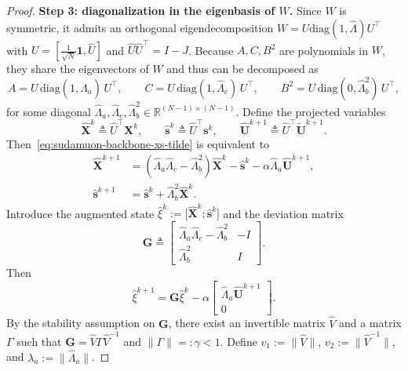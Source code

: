 \documentclass{article}
\newcommand{\G}{\mathbf{G}}
\begin{document}
\begin{proof}
\medskip\noindent\textbf{Step 3: diagonalization in the eigenbasis of $W$.}
Since $W$ is symmetric, it admits an orthogonal eigendecomposition
$W=U\mathrm{diag}(1,\hat\Lambda)U^\top$ with $U=[\tfrac{1}{\sqrt N}\mathbf 1,\hat U]$ and $\hat U\hat U^\top=I-J$.
Because $A,C,B^2$ are polynomials in $W$, they share the eigenvectors of $W$ and thus can be decomposed as
\[
A = U\,\mathrm{diag}(1,\hat\Lambda_a)\,U^\top,\qquad
C = U\,\mathrm{diag}(1,\hat\Lambda_c)\,U^\top,\qquad
B^2 = U\,\mathrm{diag}(0,\hat\Lambda_b^2)\,U^\top,
\]
for some diagonal $\hat\Lambda_a,\hat\Lambda_c,\hat\Lambda_b^2\in\mathbb{R}^{(N-1)\times(N-1)}$.
Define the projected variables
\[
\hat{\mathbf X}^k \triangleq \hat U^\top\mathbf X^k,\qquad
\hat{\mathbf s}^k \triangleq \hat U^\top\mathbf s^k,
\qquad
\hat{\mathbf U}^{k+1}\triangleq \hat U^\top\tilde{\mathbf U}^{k+1}.
\]
Then~\eqref{eq:sudamuon-backbone-xs-tilde} is equivalent to
\begin{subequations}
\label{eq:sudamuon-backbone-projected}
\begin{align}
\hat{\mathbf X}^{k+1}
&= (\hat\Lambda_a\hat\Lambda_c-\hat\Lambda_b^2)\hat{\mathbf X}^k - \hat{\mathbf s}^k - \alpha\hat\Lambda_a\hat{\mathbf U}^{k+1},\\
\hat{\mathbf s}^{k+1}
&= \hat{\mathbf s}^k + \hat\Lambda_b^2\hat{\mathbf X}^k.
\end{align}
\end{subequations}
Introduce the augmented state $\hat\xi^k:=\bigl[\hat{\mathbf X}^k;\hat{\mathbf s}^k\bigr]$ and the deviation matrix
\[
\G\triangleq
\begin{bmatrix}
\hat\Lambda_a\hat\Lambda_c-\hat\Lambda_b^2 & -I\\
\hat\Lambda_b^2 & I
\end{bmatrix}.
\]
Then
\begin{equation}
\label{eq:sudamuon-backbone-xi-rec}
\hat\xi^{k+1}=\G\hat\xi^k-\alpha\begin{bmatrix}\hat\Lambda_a\hat{\mathbf U}^{k+1}\\0\end{bmatrix}.
\end{equation}
By the stability assumption on $\G$, there exist an invertible matrix $\hat V$ and a matrix $\Gamma$ such that
$\G=\hat V\Gamma\hat V^{-1}$ and $\|\Gamma\|=: \gamma<1$.
Define $v_1:=\|\hat V\|$, $v_2:=\|\hat V^{-1}\|$, and $\lambda_a:=\|\hat\Lambda_a\|$.


\end{proof}
\end{document}
